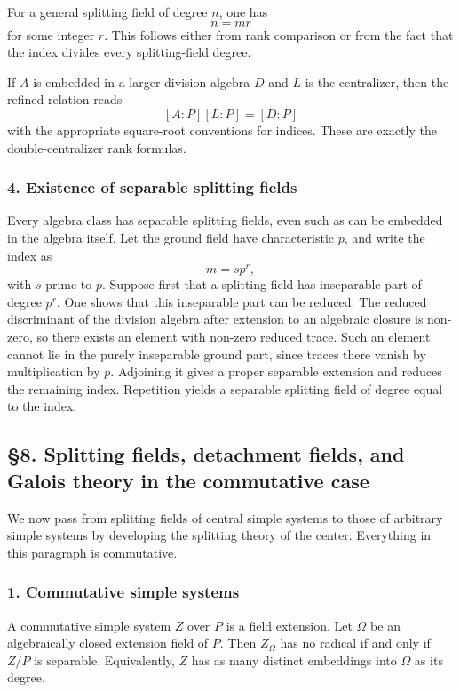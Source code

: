 \documentclass[11pt]{article}
\begin{document}
For a general splitting field of degree \(n\), one has \[
  n=mr
\] for some integer \(r\). This follows either from rank comparison or
from the fact that the index divides every splitting-field degree.

If \(A\) is embedded in a larger division algebra \(D\) and \(L\) is the
centralizer, then the refined relation reads \[
  [A:P][L:P]=[D:P]
\] with the appropriate square-root conventions for indices. These are
exactly the double-centralizer rank formulas.

\subsubsection{4. Existence of separable splitting
fields}\label{existence-of-separable-splitting-fields}

Every algebra class has separable splitting fields, even such as can be
embedded in the algebra itself. Let the ground field have characteristic
\(p\), and write the index as \[
  m=s p^r,
\] with \(s\) prime to \(p\). Suppose first that a splitting field has
inseparable part of degree \(p^r\). One shows that this inseparable part
can be reduced. The reduced discriminant of the division algebra after
extension to an algebraic closure is non-zero, so there exists an
element with non-zero reduced trace. Such an element cannot lie in the
purely inseparable ground part, since traces there vanish by
multiplication by \(p\). Adjoining it gives a proper separable extension
and reduces the remaining index. Repetition yields a separable splitting
field of degree equal to the index.

\subsection{§8. Splitting fields, detachment fields, and Galois theory
in the commutative
case}\label{splitting-fields-detachment-fields-and-galois-theory-in-the-commutative-case}

We now pass from splitting fields of central simple systems to those of
arbitrary simple systems by developing the splitting theory of the
center. Everything in this paragraph is commutative.

\subsubsection{1. Commutative simple
systems}\label{commutative-simple-systems}

A commutative simple system \(Z\) over \(P\) is a field extension. Let
\(\Omega\) be an algebraically closed extension field of \(P\). Then
\(Z_\Omega\) has no radical if and only if \(Z/P\) is separable.
Equivalently, \(Z\) has as many distinct embeddings into \(\Omega\) as
its degree.
\end{document}
